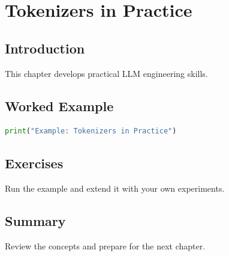 \chapter{Tokenizers in Practice}
\label{chap:vol9-7}



\section{Introduction}
This chapter develops practical LLM engineering skills.

\section{Worked Example}
\begin{lstlisting}[language=Python]
print("Example: Tokenizers in Practice")
\end{lstlisting}

\section{Exercises}
\begin{exercise}
Run the example and extend it with your own experiments.
\end{exercise}

\section{Summary}
Review the concepts and prepare for the next chapter.
